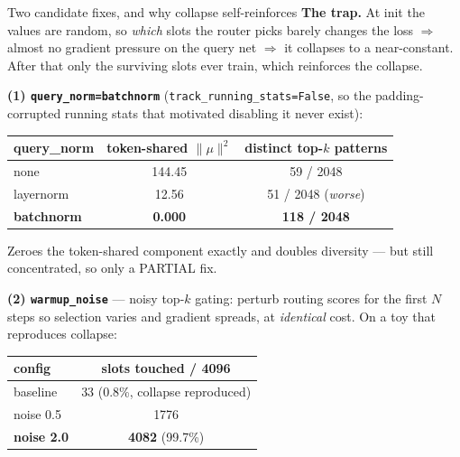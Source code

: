 \documentclass{beamer}
\begin{document}
\begin{frame}{Two candidate fixes, and why collapse self-reinforces}
\textbf{The trap.} At init the values are random, so \emph{which} slots the router
picks barely changes the loss $\Rightarrow$ almost no gradient pressure on the
query net $\Rightarrow$ it collapses to a near-constant. After that only the
surviving slots ever train, which reinforces the collapse.

\medskip
\textbf{(1) \texttt{query\_norm=batchnorm}} (\texttt{track\_running\_stats=False},
so the padding-corrupted running stats that motivated disabling it never exist):
\begin{center}
\begin{tabular}{|l|c|c|}
\hline
query\_norm & token-shared $\|\mu\|^2$ & distinct top-$k$ patterns \\
\hline
none      & 144.45 & 59 / 2048 \\
layernorm & 12.56  & 51 / 2048 \quad(\emph{worse}) \\
\textbf{batchnorm} & \textbf{0.000} & \textbf{118 / 2048} \\
\hline
\end{tabular}
\end{center}
Zeroes the token-shared component exactly and doubles diversity ---
\alert{but still concentrated, so only a PARTIAL fix.}

\medskip
\textbf{(2) \texttt{warmup\_noise}} --- noisy top-$k$ gating: perturb routing
scores for the first $N$ steps so selection varies and gradient spreads, at
\emph{identical} cost. On a toy that reproduces collapse:
\begin{center}
\begin{tabular}{|l|c|}
\hline
config & slots touched / 4096 \\
\hline
baseline  & \alert{33} \quad(0.8\%, collapse reproduced) \\
noise 0.5 & 1776 \\
\textbf{noise 2.0} & \textbf{4082} \quad(99.7\%) \\
\hline
\end{tabular}
\end{center}
\end{frame}
\end{document}
